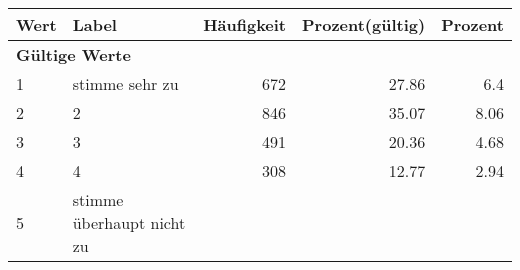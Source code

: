      \begin{longtable}{lXrrr}
     \toprule
     \textbf{Wert} & \textbf{Label} & \textbf{Häufigkeit} & \textbf{Prozent(gültig)} & \textbf{Prozent} \\
     \endhead
     \midrule
     \multicolumn{5}{l}{\textbf{Gültige Werte}}\\

     1 &
     \multicolumn{1}{X}{ stimme sehr zu   } &


       \num{672} &
       \num[round-mode=places,round-precision=2]{27.86} &
         \num[round-mode=places,round-precision=2]{6.4} \\

     2 &
     \multicolumn{1}{X}{ 2   } &


       \num{846} &
       \num[round-mode=places,round-precision=2]{35.07} &
         \num[round-mode=places,round-precision=2]{8.06} \\

     3 &
     \multicolumn{1}{X}{ 3   } &


       \num{491} &
       \num[round-mode=places,round-precision=2]{20.36} &
         \num[round-mode=places,round-precision=2]{4.68} \\

     4 &
     \multicolumn{1}{X}{ 4   } &


       \num{308} &
       \num[round-mode=places,round-precision=2]{12.77} &
         \num[round-mode=places,round-precision=2]{2.94} \\

     5 &
     \multicolumn{1}{X}{ stimme überhaupt nicht zu   } &



\end{longtable}
